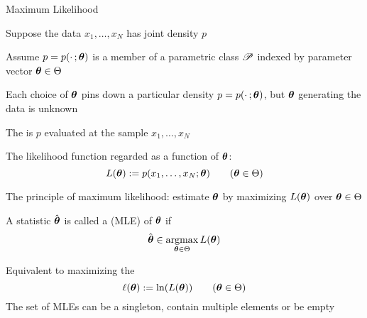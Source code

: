 \begin{frame}{Maximum Likelihood}

    \vspace{2em}
    Suppose the data $x_1,\ldots,x_N$ has joint density $p$ 
    
    \vspace{.7em}
    Assume $p = p(\cdot \,; {\boldsymbol \theta})$ is
    a member of a parametric class $\mathscr P$ indexed by parameter vector ${\boldsymbol \theta} \in
    \Theta$
    
    \vspace{.7em}
    Each choice of ${\boldsymbol \theta}$ pins down a particular density $p =
    p(\cdot \,;
    {\boldsymbol \theta})$, but ${\boldsymbol \theta}$ generating the data is unknown
    
\end{frame}

\begin{frame}

    \vspace{2em}
    The  is $p$ evaluated at the sample
    $x_1,\ldots,x_N$
    
    \vspace{.7em}
    The likelihood function regarded as a function of ${\boldsymbol \theta}$:
    \begin{equation*}
        \label{eq:deflf0}
        L({\boldsymbol \theta}) := p(x_1,\ldots,x_N ; {\boldsymbol \theta})
        \qquad ({\boldsymbol \theta} \in \Theta)
    \end{equation*}
    
\end{frame}

\begin{frame}

    \vspace{2em}
    The principle of maximum likelihood: estimate ${\boldsymbol \theta}$ by
    maximizing $L({\boldsymbol \theta})$ over ${\boldsymbol \theta} \in \Theta$
    
    A statistic $\hat {{\boldsymbol \theta}}$ is called a 
    (MLE) of ${\boldsymbol \theta}$ if 
    \begin{equation*}
        \label{eq:defmle}
        \hat \boldtheta \in \argmax_{\boldtheta \in \Theta} L(\boldtheta) 
    \end{equation*}
    
    \vspace{.7em}
    Equivalent to maximizing the 
    \begin{equation*}
        \ell({\boldsymbol \theta}) := \ln (L({\boldsymbol \theta})) 
        \qquad ({\boldsymbol \theta} \in \Theta)
    \end{equation*}
    The set of MLEs can be a singleton, contain multiple elements or be
    empty
    
\end{frame}

